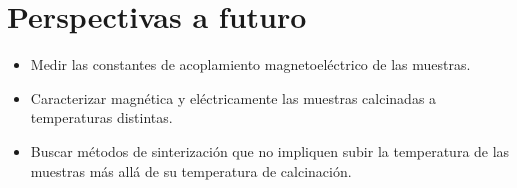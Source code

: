 \documentclass[../main.tex]{subfiles}
\begin{document}
\chapter{Perspectivas a futuro}
\begin{itemize}
    \item Medir las constantes de acoplamiento magnetoeléctrico de las muestras.
    \item Caracterizar magnética y eléctricamente las muestras calcinadas a temperaturas distintas.
    \item Buscar métodos de sinterización que no impliquen subir la temperatura de las muestras más allá de su temperatura de calcinación.
\end{itemize}
\end{document}
